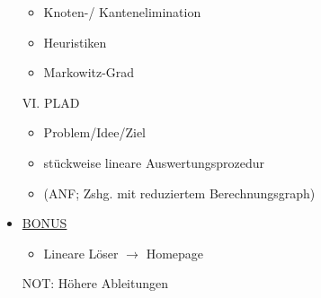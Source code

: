 \begin{itemize}
\begin{itemize}
		\item Knoten-/ Kantenelimination
		\item Heuristiken
		\item Markowitz-Grad
	\end{itemize}
	\item[VI.] PLAD
	\begin{itemize}
		\item Problem/Idee/Ziel
		\item stückweise lineare Auswertungsprozedur
		\item (ANF; Zshg. mit reduziertem Berechnungsgraph)
	\end{itemize}
	\item \underline{BONUS}
	\begin{itemize}
		\item Lineare Löser $\rightarrow$ Homepage
	\end{itemize}
	\item [NOT:] Höhere Ableitungen
\end{itemize}